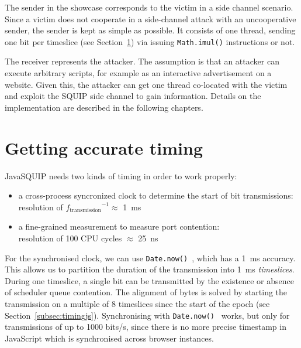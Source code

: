 \documentclass[11pt,
  titlepage=false,
  parskip=half,      %
]{scrreprt}
\begin{document}
The sender in the showcase corresponds to the victim in a side channel scenario.
Since a victim does not cooperate in a side-channel attack with an uncooperative sender, the sender is kept as simple as possible.
It consists of one thread, sending one bit per timeslice (see Section~\ref{sec:accurate-timing}) via issuing \texttt{Math.imul()} instructions or not.

The receiver represents the attacker.
The assumption is that an attacker can execute arbitrary scripts, for example as an interactive advertisement on a website.
Given this, the attacker can get one thread co-located with the victim and exploit the SQUIP side channel to gain information.
Details on the implementation are described in the following chapters.

\section{Getting accurate timing}
\label{sec:accurate-timing}
JavaSQUIP needs two kinds of timing in order to work properly:
\begin{itemize}
    \item a cross-process syncronized clock to determine the start of bit transmissions:\\
    resolution of ${f_{\text{transmission}}}^{-1} \approx$ 1~ms
    \item a fine-grained measurement to measure port contention:\\
    resolution of 100 CPU cycles $\approx$ 25~ns
\end{itemize}

For the synchronised clock, we can use \texttt{Date.now()}~\cite{datenow}, which has a 1~ms accuracy.
This allows us to partition the duration of the transmission into 1~ms \textit{timeslices}.
During one timeslice, a single bit can be transmitted by the existence or absence of scheduler queue contention.
The alignment of bytes is solved by starting the transmission on a multiple of 8 timeslices since the start of the epoch (see Section~\ref{subsec:timingjs}).
Synchronising with \texttt{Date.now()}~\cite{datenow} works, but only for transmissions of up to 1000 bits/s,
since there is no more precise timestamp in JavaScript which is synchronised across browser instances.

\end{document}
